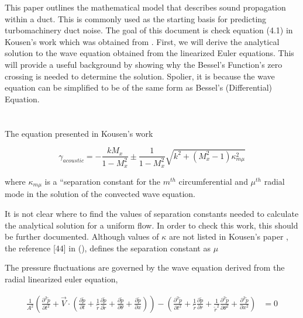 \documentclass[a4paper]{article}
\begin{document}
This paper outlines the mathematical model that describes sound propagation 
within a duct. This is commonly used as the starting basis for predicting 
turbomachinery duct noise. The goal of this document is check equation (4.1) 
in Kousen's work \cite{Kousen1999} which was obtained from \cite{Kerrebrock1992}.
First, we will derive the analytical solution to the wave equation obtained 
from the linearized Euler equations. This will provide a useful background by
showing why the Bessel's Function's zero crossing is needed to determine the 
solution. Spolier, it is because the wave equation can be simplified to be
of the same form as Bessel's (Differential) Equation. 

\section{}

The equation presented in Kousen's work

\begin{equation}
    \gamma_{acoustic} = 
    - \frac{k M_x}{1 - M_x^2} \pm 
    \frac{1}{1-M_x^2} 
    \sqrt{k^2 + (M_x^2-1) \kappa_{m \mu}^2}
    \label{eqn:4_1}
\end{equation}

where $\kappa _{m \mu}$ is a ``separation constant for the $m^{th}$ 
circumferential and $\mu^{th}$ radial mode in the solution of the convected 
wave equation.

It is not clear where to find the values of separation constants needed to 
calculate the analytical solution for a uniform flow. In order to check 
this work, this should be further documented. Although values of $\kappa$ are 
not listed in Kousen's paper \cite{Kousen1999}, the reference [44] in \cite{Kousen1999}
(\cite{Kerrebrock1992}), defines the separation constant as $\mu $

The pressure fluctuations are governed by the wave equation derived from the
radial linearized euler equation,



\begin{align*} 
    \frac{1}{A^2}\left(
        \frac{\partial^2 \tilde{p}}{\partial t^2}
    + 
        \vec{V}\cdot \left(
            \frac{\partial\tilde{p}}{\partial t} + 
            \frac{1}{\tilde{r}}\frac{\partial \tilde{p} }{\partial \tilde{r}} +
            \frac{\partial \tilde{p}}{\partial \theta} +
            \frac{\partial \tilde{p}}{\partial x}  
        \right)  \right)-
        \left(
            \frac{\partial^2 \tilde{p}}{\partial t^2} + 
            \frac{1}{\tilde{r}}\frac{\partial \tilde{p}}{\partial r} +
            \frac{1}{\tilde{r}^2} \frac{\partial^2 \tilde{p}}{\partial \theta^2} + 
            \frac{\partial^2 \tilde{p}}{\partial x^2} 
        \right) &= 0  
\end{align*} 
\end{document}

